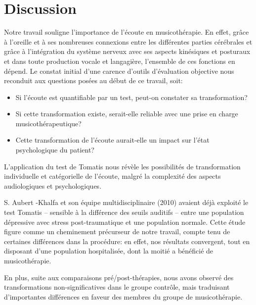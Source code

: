 \chapter{Discussion}

Notre travail souligne l'importance de l'écoute en
musicothérapie. En effet, grâce à
l'oreille et à ses nombreuses connexions entre les différentes parties
cérébrales et grâce à l'intégration du système
nerveux avec ses aspects kinésiques et posturaux et dans
toute production vocale et langagière, l'ensemble de ces fonctions en
dépend. Le constat initial d'une carence d'outils d'évaluation
objective %
nous reconduit aux questions posées au début de ce travail, soit:

\begin{itemize}
     \item Si l'écoute est quantifiable  par un test, peut-on constater sa
transformation?
\item Si cette transformation existe, serait-elle reliable avec
une prise en charge musicothérapeutique?
\item Cette transformation de l'écoute aurait-elle un impact sur l'état
psychologique du patient? %
\end{itemize}
L'application du test de Tomatis nous révèle les possibilités
de transformation individuelle et catégorielle de l'écoute, malgré la
complexité des aspects audiologiques et psychologiques.

S. Aubert -Khalfa et son équipe multidisciplinaire (2010) avaient déjà
exploité le test Tomatis -- sensible à la différence des
seuils auditifs -- entre une population
dépressive avec stress post-traumatique et une population normale.
Cette étude figure comme un cheminement précurseur de notre
travail, compte tenu de certaines différences dans la
 procédure:  %
 en effet, nos résultats convergent, tout en disposant d'une population hospitalisée,
dont la moitié a
bénéficié de
musicothérapie.


En plus, suite aux comparaisons
pré/post-thérapies, nous avons observé des transformations
non-significatives dans le groupe contrôle, mais
traduisant 
d'importantes différences en faveur des membres du groupe de musicothérapie.




